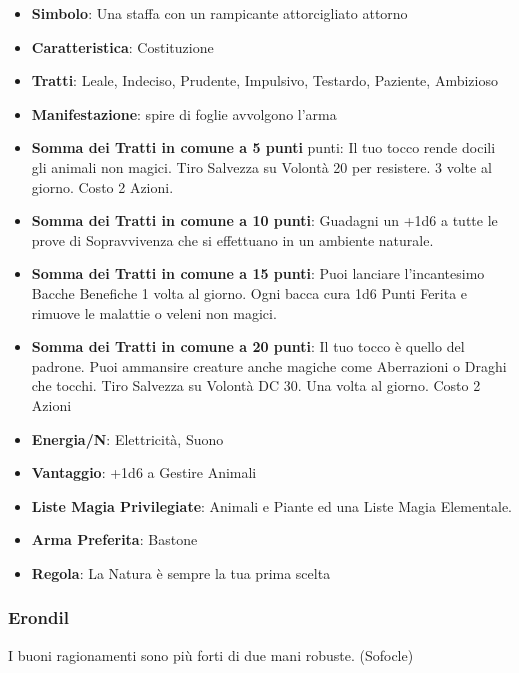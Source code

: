 \begin{multicols}{2}
\begin{itemize}[leftmargin=*] \setlength{\itemsep}{0pt}
\item \textbf{Simbolo}: Una staffa con un rampicante attorcigliato attorno
\item \textbf{Caratteristica}: Costituzione
\item \textbf{Tratti}: Leale, Indeciso, Prudente, Impulsivo, Testardo, Paziente, Ambizioso
\item \textbf{Manifestazione}: spire di foglie avvolgono l'arma
\item \textbf{Somma dei Tratti in comune a 5 punti} punti: Il tuo tocco rende docili gli animali non magici. Tiro Salvezza su Volontà 20 per resistere. 3 volte al giorno. Costo 2 Azioni.
\item \textbf{Somma dei Tratti in comune a 10 punti}: Guadagni un +1d6 a tutte le prove di Sopravvivenza che si effettuano in un ambiente naturale.
\item \textbf{Somma dei Tratti in comune a 15 punti}: Puoi lanciare l'incantesimo Bacche Benefiche 1 volta al giorno. Ogni bacca cura 1d6 Punti Ferita e rimuove le malattie o veleni non magici.
\item \textbf{Somma dei Tratti in comune a 20 punti}: Il tuo tocco è quello del padrone. Puoi ammansire creature anche magiche come Aberrazioni o Draghi che tocchi. Tiro Salvezza su Volontà DC 30. Una volta al giorno. Costo 2 Azioni
\item \textbf{Energia/N}: Elettricità, Suono
\item \textbf{Vantaggio}: +1d6 a Gestire Animali
\item \textbf{Liste Magia Privilegiate}: Animali e Piante ed una Liste Magia Elementale.
\item \textbf{Arma Preferita}: Bastone
\item \textbf{Regola}: La Natura è sempre la tua prima scelta
\end{itemize}

\subsubsection{Erondil}\label{erondil}\hypertarget{erondil}{}

\begin{changemargin}{0.3cm}{0.3cm}\begin{enfasi}{
I buoni ragionamenti sono più forti di due mani robuste. (Sofocle)
}\end{enfasi}\end{changemargin}\medskip


\end{multicols}
